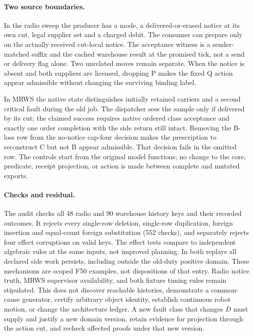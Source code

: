 \documentclass{article}
\begin{document}
\paragraph{Two source boundaries.}
In the radio sweep the producer has a mode, a delivered-or-erased
notice at its own cut, legal supplier set and a charged debit. The
consumer can prepare only on the actually received cut-local notice.
The acceptance witness is a sender-matched suffix and the cached
warehouse result at the promised tick, not a send or delivery flag
alone. Two unrelated moves remain separate. When the notice is absent
and both suppliers are licensed, dropping P makes the fixed Q action
appear admissible without changing the surviving binding label.

In MRWS the native state distinguishes initially retained carriers and
a second critical fault during the old job. The dispatcher sees the
sample only if delivered by its cut; the claimed success requires
native ordered class acceptance and exactly one order completion with
the side return still intact. Removing the B-loss row from the
no-notice cap-four decision makes the prescription to reconstruct C
but not B appear admissible. That decision fails in the omitted row.
The controls start from the original model functions; no change to
the core, predicate, receipt projection, or action is made between
complete and mutated exports.

\paragraph{Checks and residual.}
The audit checks all 48 radio and 90 warehouse history keys and their
recorded outcomes. It rejects every single-row deletion, single-row
duplication, foreign insertion and equal-count foreign substitution
(552 checks), and separately rejects four effect corruptions on valid
keys. The effect tests compare to independent algebraic rules at the
same inputs, not improved planning. In both replays all declared side
work persists, including outside the old-duty positive domain.
These mechanisms are scoped F50 examples, not dispositions of that
entry. Radio notice truth, MRWS supervisor availability, and both
fixture timing rules remain stipulated. This does not discover
reachable histories, demonstrate a common-cause generator, certify
arbitrary object identity, establish continuous robot motion, or
change the architecture ledger. A new fault class that changes \(D\)
must supply and justify a new domain version, retain evidence for
projection through the action cut, and recheck affected proofs under
that new version.
\end{document}
